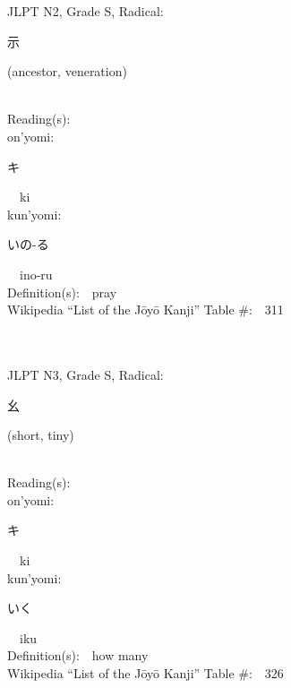 \begin{multicols}{2}
{JLPT N2, Grade S, Radical:\ \ {\begin{CJK}{UTF8}{min} 示 \end{CJK}} (ancestor, veneration) } \\
Reading(s):\ \ \\
{\hspace*{1em}}on'yomi:\ \ \\
{\hspace*{2em}}{\begin{CJK}{UTF8}{min} キ \end{CJK}}\ \ ki\ \ \\
{\hspace*{1em}}kun'yomi:\ \ \\
{\hspace*{2em}}{\begin{CJK}{UTF8}{min} いの-る \end{CJK}}\ \ ino-ru\ \ \\
Definition(s):\ \ pray \\
Wikipedia ``List of the J\=oy\=o Kanji'' Table \#:\ \ 311 \\
\ \ \\
{\fontsize{34pt}{40pt}  }\ \ \\  %
{JLPT N3, Grade S, Radical:\ \ {\begin{CJK}{UTF8}{min} 幺 \end{CJK}} (short, tiny) } \\
Reading(s):\ \ \\
{\hspace*{1em}}on'yomi:\ \ \\
{\hspace*{2em}}{\begin{CJK}{UTF8}{min} キ \end{CJK}}\ \ ki\ \ \\
{\hspace*{1em}}kun'yomi:\ \ \\
{\hspace*{2em}}{\begin{CJK}{UTF8}{min} いく \end{CJK}}\ \ iku\ \ \\
Definition(s):\ \ how many \\
Wikipedia ``List of the J\=oy\=o Kanji'' Table \#:\ \ 326 \\
\ \ \\
{\fontsize{34pt}{40pt}  }\ \ \\  %

\end{multicols}
